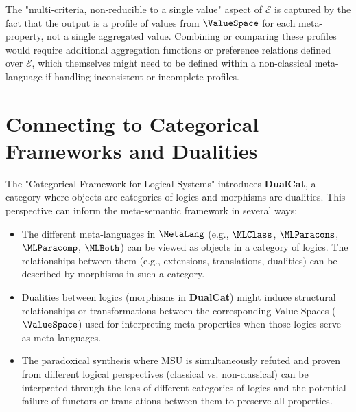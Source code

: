 															\begin{remark}
																\RaggedRight %
																The "multi-criteria, non-reducible to a single value" aspect of $\mathcal{E}$ is captured by the fact that the output is a profile of values from $\ValueSpace$ for each meta-property, not a single aggregated value. Combining or comparing these profiles would require additional aggregation functions or preference relations defined over $\mathcal{E}$, which themselves might need to be defined within a non-classical meta-language if handling inconsistent or incomplete profiles.
																\end{remark}
																	
																	\section{Connecting to Categorical Frameworks and Dualities}
																	
																	The "Categorical Framework for Logical Systems" introduces \textbf{DualCat}, a category where objects are categories of logics and morphisms are dualities. This perspective can inform the meta-semantic framework in several ways:
																	
																	\begin{itemize}[wide, labelwidth=!, labelindent=0pt, before=\RaggedRight, after=\RaggedRight] %
																		\item The different meta-languages in $\MetaLang$ (e.g., $\MLClass$, $\MLParacons$, $\MLParacomp$, $\MLBoth$) can be viewed as objects in a category of logics. The relationships between them (e.g., extensions, translations, dualities) can be described by morphisms in such a category.
																		\item Dualities between logics (morphisms in \textbf{DualCat}) might induce structural relationships or transformations between the corresponding Value Spaces ($\ValueSpace$) used for interpreting meta-properties when those logics serve as meta-languages.
																		\item The paradoxical synthesis where MSU is simultaneously refuted and proven from different logical perspectives (classical vs. non-classical) can be interpreted through the lens of different categories of logics and the potential failure of functors or translations between them to preserve all properties.
																	\end{itemize}
																	
